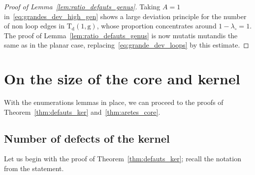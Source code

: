 \documentclass[11pt]{article}
\theoremstyle{plain}
\theoremstyle{definition}
\theoremstyle{remark}
\newcommand{\Triv}{\mathrm{T}}
\newcommand{\defect}{\mathrm{d}}
\newcommand{\gen}{\mathrm{g}}
\begin{document}
\begin{proof}[Proof of Lemma~\ref{lem:ratio_defauts_genus}]
Taking $A = 1$ in~\eqref{eq:grandes_dev_high_gen} shows a large deviation principle for the number of non loop edges in $\Triv_{\defect}(1, \gen)$, whose proportion concentrates around $1-\lambda_\circ = 1$.
The proof of Lemma~\ref{lem:ratio_defauts_genus} is now mutatis mutandis the same as in the planar case, replacing~\eqref{eq:grande_dev_loops} by this estimate.
\end{proof}

\section{On the size of the core and kernel}
\label{sec:preuve_core_kernel}

With the enumerations lemmas in place, we can proceed to the proofs of Theorem~\ref{thm:defauts_ker} and~\ref{thm:aretes_core}.

\subsection{Number of defects of the kernel}
\label{ssec:defauts_kernel}

Let us begin with the proof of Theorem~\ref{thm:defauts_ker}; recall the notation from the statement.
\end{document}
